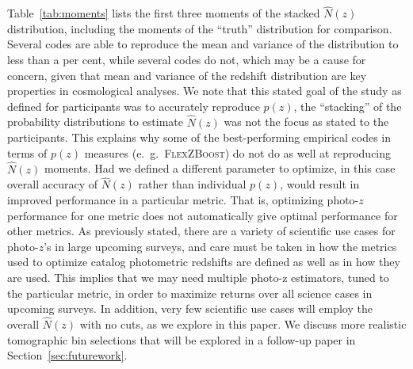 
Table~\ref{tab:moments} lists the first three moments of the stacked $\hat{N}(z)$ distribution, including the moments of the ``truth'' distribution for comparison.  Several codes are able to reproduce the mean and variance of the distribution to less than a per cent, while several codes do not, which may be a cause for concern, given that mean and variance of the redshift distribution are key properties in cosmological analyses.  We note that this stated goal of the study as defined for participants was to accurately reproduce $p(z)$, the ``stacking'' of the probability distributions to estimate $\hat{N}(z)$ was not the focus as stated to the participants.  This explains why some of the best-performing empirical codes in terms of $p(z)$ measures (e.~g.~\textsc{FlexZBoost}) do not do as well at reproducing $\hat{N}(z)$ moments.  Had we defined a different parameter to optimize, in this case overall accuracy of $\hat{N}(z)$ rather than individual $p(z)$, would result in improved performance in a particular metric.  That is, optimizing photo-$z$ performance for one metric does not automatically give optimal performance for other metrics.  As previously stated, there are a variety of scientific use cases for photo-$z$'s in large upcoming surveys, and care must be taken in how the metrics used to optimize catalog photometric redshifts are defined as well as in how they are used.  This implies that we may need multiple photo-z estimators, tuned to the particular metric, in order to maximize returns over all science cases in upcoming surveys.  In addition, very few scientific use cases will employ the overall $\hat{N}(z)$ with no cuts, as we explore in this paper.  We discuss more realistic tomographic bin selections that will be explored in a follow-up paper in Section~\ref{sec:futurework}.

